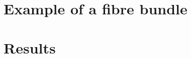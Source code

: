 %
%
%
%
%
%
%
%

\Introduction







\section{Example of a fibre bundle}

\section{Results}

\Conc




